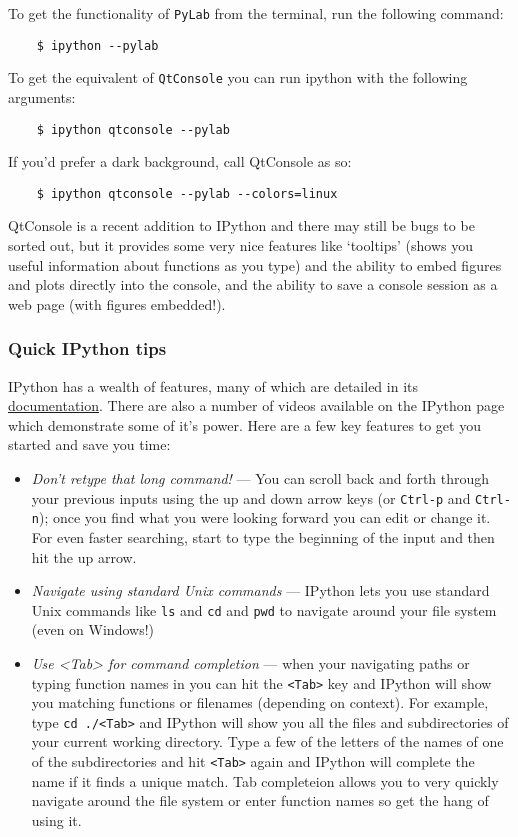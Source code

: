 To get the functionality of \lstinline!PyLab! from the terminal, run the
following command:

\begin{lstlisting}
    $ ipython --pylab
\end{lstlisting}
To get the equivalent of \lstinline!QtConsole! you can run ipython with
the following arguments:

\begin{lstlisting}
    $ ipython qtconsole --pylab
\end{lstlisting}
If you'd prefer a dark background, call QtConsole as so:

\begin{lstlisting}
    $ ipython qtconsole --pylab --colors=linux
\end{lstlisting}
QtConsole is a recent addition to IPython and there may still be bugs to
be sorted out, but it provides some very nice features like `tooltips'
(shows you useful information about functions as you type) and the
ability to embed figures and plots directly into the console, and the
ability to save a console session as a web page (with figures
embedded!).

\subsubsection{Quick IPython tips}

IPython has a wealth of features, many of which are detailed in its
\href{http://ipython.org/documentation.html}{documentation}. There are
also a number of videos available on the IPython page which demonstrate
some of it's power. Here are a few key features to get you started and
save you time:

\begin{itemize}
\item
  \emph{Don't retype that long command!} --- You can scroll back and
  forth through your previous inputs using the up and down arrow keys
  (or \lstinline!Ctrl-p! and \lstinline!Ctrl-n!); once you find what you
  were looking forward you can edit or change it. For even faster
  searching, start to type the beginning of the input and then hit the
  up arrow.
\item
  \emph{Navigate using standard Unix commands} --- IPython lets you use
  standard Unix commands like \lstinline!ls! and \lstinline!cd! and
  \lstinline!pwd! to navigate around your file system (even on Windows!)
\item
  \emph{Use \textless{}Tab\textgreater{} for command completion} ---
  when your navigating paths or typing function names in you can hit the
  \lstinline!<Tab>! key and IPython will show you matching functions or
  filenames (depending on context). For example, type
  \lstinline!cd ./<Tab>! and IPython will show you all the files and
  subdirectories of your current working directory. Type a few of the
  letters of the names of one of the subdirectories and hit
  \lstinline!<Tab>! again and IPython will complete the name if it finds
  a unique match. Tab completeion allows you to very quickly navigate
  around the file system or enter function names so get the hang of
  using it.
\end{itemize}
